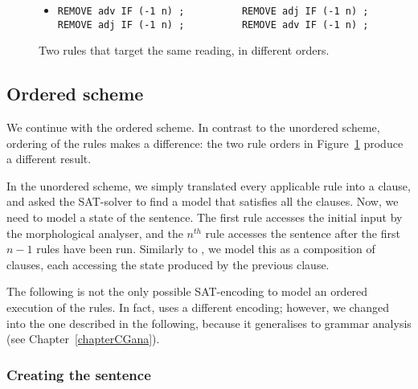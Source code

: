 

\begin{figure}
  \begin{itemize}
   \item[] \begin{verbatim}REMOVE adv IF (-1 n) ;          REMOVE adj IF (-1 n) ;
REMOVE adj IF (-1 n) ;          REMOVE adv IF (-1 n) ;\end{verbatim}
   \end{itemize}
   \caption{Two rules that target the same reading, in different orders.}
   \label{fig:orderMatters}
\end{figure}

\subsection{Ordered scheme}

We continue with the ordered scheme. In contrast to the unordered scheme, ordering of the rules makes a difference: the two rule orders in Figure~\ref{fig:orderMatters} produce a different result.

In the unordered scheme, we simply translated every applicable rule into a clause, and asked the SAT-solver to find a model that satisfies all the clauses. 
Now, we need to model a state of the sentence. The first rule accesses the initial input
by the morphological analyser, and the $n^{th}$ rule accesses the sentence after the first $n-1$ rules have been run.
Similarly to \cite{lager_nivre01}, we model this as a composition of clauses, each accessing the state produced by the previous clause.


The following is not the only possible SAT-encoding to model an ordered execution of the rules. In fact, \cite{listenmaa_claessen2015} uses a different encoding; however, we changed into the one described in the following, because it generalises to grammar analysis (see Chapter~\ref{chapterCGana}).

\subsubsection{Creating the sentence}

